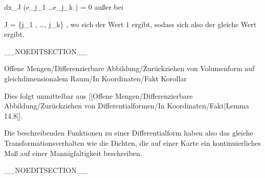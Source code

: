 {\mavergleichskette
{\vergleichskette
{ dx_J (e_{j_1 } \wedge \ldots \wedge e_{j_k })
}
{ = }{ 0
}
{  }{
}
{    }{
}
{   }{
}
}
{}{}{}
außer bei

\mavergleichskette
{\vergleichskette
{ J
}
{ = }{ \{j_1 , \ldots , j_k\}
}
{  }{
}
{    }{
}
{   }{
}
}
{}{}{,}
wo sich der Wert $1$ ergibt, sodass sich also der gleiche Wert ergibt.

}

__NOEDITSECTION__

{Offene Mengen/Differenzierbare Abbildung/Zurückziehen von Volumenform auf gleichdimensionalem Raum/In Koordinaten/Fakt}
{Korollar}
{}
{

\faktzusatz {}
\faktzusatz {}

}
{

Dies folgt unmittelbar aus
[[Offene Mengen/Differenzierbare Abbildung/Zurückziehen von Differentialformen/In Koordinaten/Fakt|Lemma 14.8]].

}
Die beschreibenden Funktionen zu einer Differentialform haben also das gleiche Transformationsverhalten wie die Dichten, die auf einer Karte ein kontinuierliches Maß auf einer Mannigfaltigkeit beschreiben.

__NOEDITSECTION__

